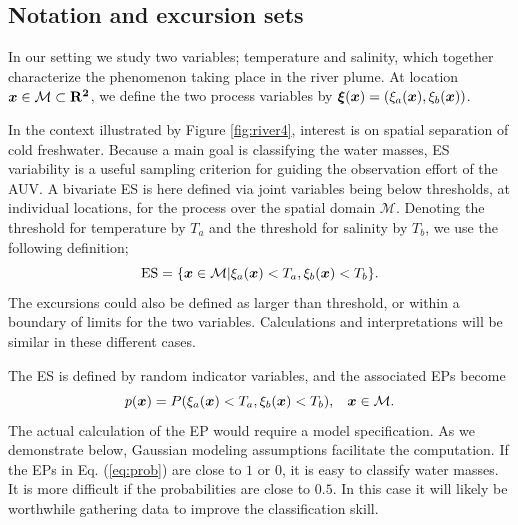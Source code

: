 \documentclass[aoas]{imsart}
\begin{document}


\subsection{Notation and excursion sets}

In our setting we study two variables; temperature and salinity, which together characterize the phenomenon taking place in the river plume. At location ${\boldsymbol x} \in \mathcal{M} \subset \mathbf{R^2}$, we define the two process variables by ${\boldsymbol \xi}({\boldsymbol x})=(\xi_a({\boldsymbol x}),\xi_b({\boldsymbol x}))$. %

In the context illustrated by Figure \ref{fig:river4}, interest is on spatial separation of cold freshwater. 
Because a main goal is classifying the water masses, ES variability is a useful sampling criterion for guiding the observation effort of the AUV. 
A bivariate ES is here defined via joint variables being below thresholds, at individual locations, for the process over the spatial domain $\mathcal{M}$.
Denoting the threshold for temperature by $T_a$ and the threshold for salinity by $T_b$,
we use the following definition;
 \begin{equation}\label{ES}
     \mbox{ES} = \{\bx \in \mathcal{M} | \xi_a(\bx) < T_a,\xi_b(\bx) < T_b\}.
 \end{equation}
The excursions could also be defined as larger than threshold, or within a boundary of limits for the two variables. Calculations and interpretations will be similar in these different cases. 

The ES is defined by random indicator variables, and the associated EPs become 
\begin{equation}\label{eq:prob}
 p(\bx) = P(\xi_a(\bx) < T_a, \xi_b(\bx) < T_b), \hspace{3mm} \bx \in \mathcal{M}.
\end{equation}
The actual calculation of the EP would require a model specification. As we demonstrate below, Gaussian modeling assumptions facilitate the computation. 
If the EPs in Eq. (\ref{eq:prob}) are close to $1$ or $0$, it is easy to classify water masses. It is more difficult if the probabilities are close to $0.5$. In this case it will likely be worthwhile gathering data to improve the classification skill. 
\end{document}
